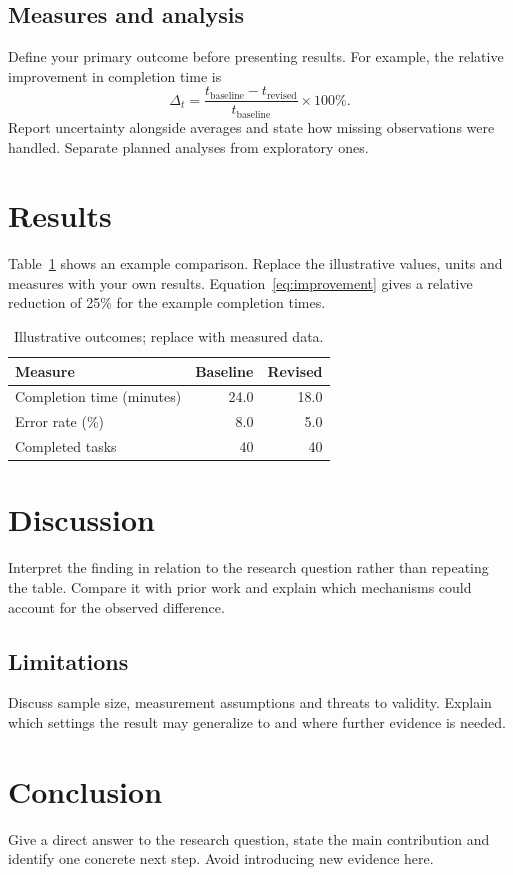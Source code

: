 \documentclass[11pt,a4paper]{article}
\begin{document}
\subsection{Measures and analysis}
Define your primary outcome before presenting results. For example, the relative
improvement in completion time is
\begin{equation}
\Delta_t = \frac{t_{\mathrm{baseline}}-t_{\mathrm{revised}}}{t_{\mathrm{baseline}}}\times100\%.
\label{eq:improvement}
\end{equation}
Report uncertainty alongside averages and state how missing observations were
handled. Separate planned analyses from exploratory ones.
\section{Results}
Table~\ref{tab:results} shows an example comparison. Replace the illustrative values,
units and measures with your own results. Equation~\ref{eq:improvement} gives a
relative reduction of 25\% for the example completion times.
\begin{table}[htbp]
\centering
\caption{Illustrative outcomes; replace with measured data.}
\label{tab:results}
\begin{tabularx}{\linewidth}{@{}Xrr@{}}
\toprule
\textbf{Measure} & \textbf{Baseline} & \textbf{Revised}\\
\midrule
Completion time (minutes) & 24.0 & 18.0\\
Error rate (\%) & 8.0 & 5.0\\
Completed tasks & 40 & 40\\
\bottomrule
\end{tabularx}
\end{table}
\section{Discussion}
Interpret the finding in relation to the research question rather than repeating
the table. Compare it with prior work and explain which mechanisms could account
for the observed difference.
\subsection{Limitations}
Discuss sample size, measurement assumptions and threats to validity. Explain
which settings the result may generalize to and where further evidence is needed.
\section{Conclusion}
Give a direct answer to the research question, state the main contribution and
identify one concrete next step. Avoid introducing new evidence here.
\end{document}
